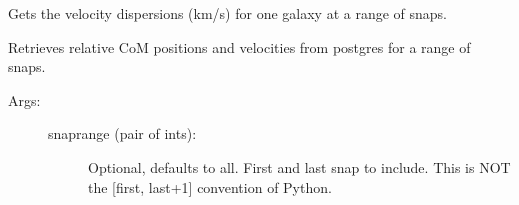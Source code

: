 \documentclass[letterpaper,10pt,english]{sphinxmanual}
\begin{document}
\begin{fulllineitems}

\begin{fulllineitems}
\label{\detokenize{timecourse:galaxy.timecourse.TimeCourse.read_sigmas_db}}
Gets the velocity dispersions (km/s) for one galaxy at a range of snaps.

\end{fulllineitems}


\begin{fulllineitems}
\label{\detokenize{timecourse:galaxy.timecourse.TimeCourse.read_relmotion_db}}
Retrieves relative CoM positions and velocities from postgres 
for a range of snaps.
\begin{description}
\item[{Args:}] \leavevmode\begin{description}
\item[{snaprange (pair of ints):}] \leavevmode
Optional, defaults to all. First and last snap to include.
This is NOT the {[}first, last+1{]} convention of Python.

\end{description}

\end{description}

\end{fulllineitems}


\begin{fulllineitems}
\label{\detokenize{timecourse:galaxy.timecourse.TimeCourse.snap2time}}
\end{fulllineitems}



\end{fulllineitems}
\end{document}
